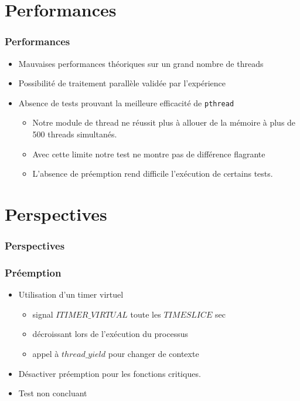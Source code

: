 \documentclass{beamer}
\begin{document}
\section{Performances}

\begin{frame}
  \frametitle{Performances}
  \begin{itemize}
    \item Mauvaises performances théoriques sur un grand nombre de threads
    \item Possibilité de traitement parallèle validée par l'expérience
    \item Absence de tests prouvant la meilleure efficacité de \verb!pthread!
      \begin{itemize}
        \item Notre module de thread ne réussit plus à allouer de la mémoire
          à plus de 500 threads simultanés.
        \item Avec cette limite notre test ne montre pas de différence
          flagrante
        \item L'absence de préemption rend difficile l'exécution de certains
          tests.
      \end{itemize}
  \end{itemize}
\end{frame}

\section{Perspectives}

\begin{frame}
  \frametitle{Perspectives}
\end{frame}

\begin{frame}
  \frametitle{Préemption}
  \begin{itemize}
    \item Utilisation d'un timer virtuel
      \begin{itemize}
      \item signal $ITIMER\_VIRTUAL$ toute les $TIMESLICE$ sec
      \item décroissant lors de l'exécution du processus
      \item appel à $thread\_yield$ pour changer de contexte
      \end{itemize}
    \item Désactiver préemption pour les fonctions critiques.
    \item Test non concluant
  \end{itemize}
\end{frame}
\end{document}
